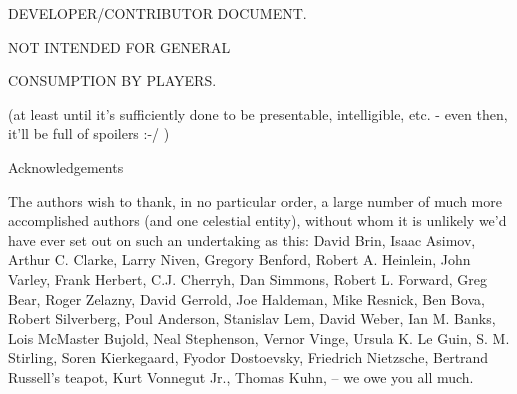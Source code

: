 \vspace{1cm}
\centerline{\LARGE DEVELOPER/CONTRIBUTOR DOCUMENT.}
\vspace{0.5cm}
\centerline{\LARGE NOT INTENDED FOR GENERAL}
\vspace{0.5cm}
\centerline{\LARGE CONSUMPTION BY PLAYERS.}
\vspace{0.5cm}
\centerline{(at least until it's sufficiently done to be presentable, intelligible, etc. - even then, it'll be full of spoilers :-/ )}
\vspace{3cm}
\clearpage
{\centerline{\LARGE Acknowledgements}}
\vspace{2cm}

{\rm 

The authors wish to thank, in no particular order, a large number of
much more accomplished authors (and one celestial entity), without
whom it is unlikely we'd have ever set out on such an undertaking as
this: David Brin, Isaac Asimov, Arthur C. Clarke, Larry Niven, Gregory
Benford, Robert A. Heinlein, John Varley, Frank Herbert, C.J. Cherryh,
Dan Simmons, Robert L. Forward, Greg Bear, Roger Zelazny, David
Gerrold, Joe Haldeman, Mike Resnick, Ben Bova, Robert Silverberg, Poul
Anderson, Stanislav Lem, David Weber, Ian M. Banks, Lois McMaster
Bujold, Neal Stephenson, Vernor Vinge, Ursula K. Le Guin,
S. M. Stirling, Soren Kierkegaard, Fyodor Dostoevsky, Friedrich
Nietzsche, Bertrand Russell's teapot, Kurt Vonnegut Jr., Thomas Kuhn,
-- we owe you all much.

}
